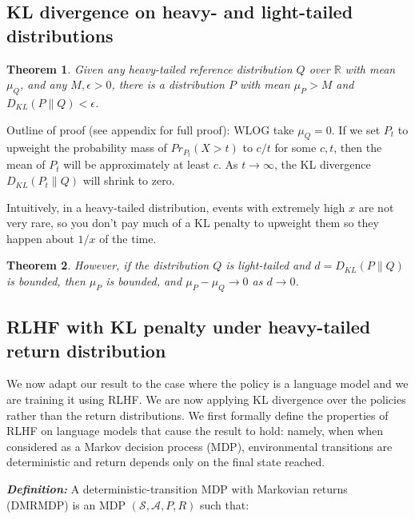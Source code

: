 \documentclass{article}
\newtheorem{theorem}{Theorem}
\begin{document}
\subsection{KL divergence on heavy- and light-tailed distributions}
\begin{theorem}
\label{thm1}
Given any heavy-tailed reference distribution
\(Q\) over \(\mathbb R\) with mean \(\mu_Q\), and any
\(M, \epsilon > 0\), there is a distribution \(P\) with mean \(\mu_P>M\)
and \(D_{KL}(P \| Q) < \epsilon\).
\end{theorem}

Outline of proof (see appendix for full proof): WLOG take $\mu_Q = 0$. If we set $P_t$ to upweight the probability mass of $Pr_{P_t}(X > t)$ to $c/t$ for some $c, t$, then the mean of $P_t$ will be approximately at least $c$. As $t \to \infty$, the KL divergence $D_{KL}(P_t \| Q)$ will shrink to zero.

Intuitively, in a heavy-tailed distribution, events with extremely high $x$ are not very rare, so you don't pay much of a KL penalty to upweight them so they happen about $1/x$ of the time. 

\begin{theorem}
    \label{thm2} However, if the distribution $Q$ is light-tailed and \(d = D_{KL}(P \| Q)\) is bounded, then
    \(\mathbb \mu_P \) is bounded, and \(\mu_P - \mu_Q \to 0\) as
    \(d \to 0\).
    \end{theorem}

\hypertarget{theorem-about-RLHF-with-KL-penalty}{%
\subsection{RLHF with KL penalty under heavy-tailed return distribution}}

We now adapt our result to the case where the policy is a language model and we are training it using RLHF. We are now applying KL divergence over the policies rather than the return distributions. We first formally define the properties of RLHF on language models that cause the result to hold: namely, when when considered as a Markov decision process (MDP), environmental transitions are deterministic and return depends only on the final state reached.

\textbf{\emph{Definition:}} A deterministic-transition MDP with
Markovian returns (DMRMDP) is an MDP \((\mathcal S, \mathcal A, P, R)\)
such that:
\end{document}
